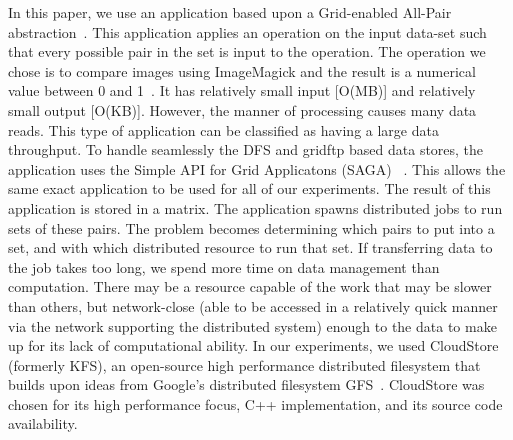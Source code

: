 \documentclass[a4paper,11pt]{article}
\newcommand{\jhanote}[1]{ {\textcolor{red} { ***Jha: #1 }}}
\newcommand{\jhanote}[1]{}
\begin{document}

In this paper, we use an application based upon a Grid-enabled All-Pair abstraction~\cite{Interop, AllPairs}. This application applies an operation on the input data-set such that every possible pair in the set is input to the operation. The operation we chose is to compare images using ImageMagick and the result is a numerical value between 0 and 1~\cite{imagemagick}. It has relatively small input [O(MB)] and relatively small output [O(KB)]. However, the manner of processing causes many data reads. This type of application can be classified as having a large data throughput. To handle seamlessly the DFS and gridftp based data stores, the application uses the Simple API for Grid Applicatons (SAGA) ~\cite{saga_web}. This allows the same exact application to be used for all of our experiments. The result of this application is stored in a matrix. The application spawns distributed jobs to run sets of these pairs. The problem becomes determining which pairs to put into a set, and with which distributed resource to run that set. If transferring data to the job takes too long, we spend more time on data management than computation. There may be a resource capable of the work that may be slower than others, but network-close (able to be accessed in a relatively quick manner via the network supporting the distributed system) enough to the data to make up for its lack of computational ability. In our experiments, we used CloudStore (formerly KFS), an open-source high performance distributed filesystem that builds upon ideas from Google's distributed filesystem GFS~\cite{kfs_web}. CloudStore was chosen for its high performance focus, C++ implementation, and its source code availability.
\end{document}
